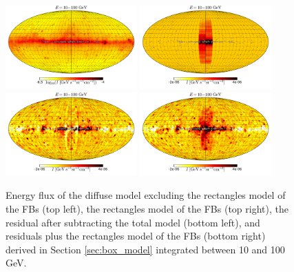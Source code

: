 \begin{figure}[h]
\centering
 \includegraphics[width=0.45\textwidth]{plots/Mollweide_Boxes_model_0p3-1p0GeV_flux_source_range_1_log.pdf}
\includegraphics[width=0.45\textwidth]{plots/Mollweide_Boxes_0p3-1p0GeV_flux_source_range_1.pdf}\\
\includegraphics[width=0.45\textwidth]{plots/Mollweide_Boxes_residual_0p3-1p0GeV_flux_source_range_1.pdf}
 \includegraphics[width=0.45\textwidth]{plots/Mollweide_Boxes_residual+boxes_0p3-1p0GeV_flux_source_range_1.pdf}
 \caption{Energy flux of the diffuse model excluding the rectangles model of the FBs (top left),
 the rectangles model of the FBs (top right), 
the residual after subtracting the total model (bottom left),
and residuals plus the rectangles model of the FBs (bottom right)
 derived in Section \ref{sec:box_model}
 integrated between 10 and 100 GeV.}
 \label{fig:Maps_Rectangles}
\end{figure}

